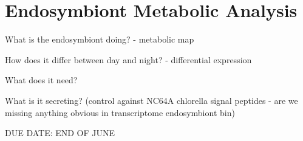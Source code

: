 \graphicspath{{chapters/6.Chapter_4/figures}}

\chapter{Endosymbiont Metabolic Analysis}

What is the endosymbiont doing? - metabolic map

How does it differ between day and night? - differential expression

What does it need?

What is it secreting? (control against NC64A chlorella signal peptides - are we missing anything obvious in transcriptome endosymbiont bin)

DUE DATE: END OF JUNE

